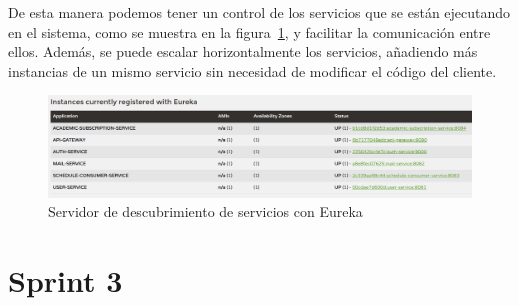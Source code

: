 De esta manera podemos tener un control de los servicios que se están ejecutando en el sistema, como se muestra en la figura~\ref{eureka}, y facilitar la comunicación entre ellos. Además, se puede escalar horizontalmente los servicios, añadiendo más instancias de un mismo servicio sin necesidad de modificar el código del cliente.

\begin{figure}[H]
    \centering
    \includegraphics[width=1\textwidth]{figures/07_eureka.png}
    \caption{Servidor de descubrimiento de servicios con Eureka}
    \label{eureka}
\end{figure}

\section{Sprint 3}


